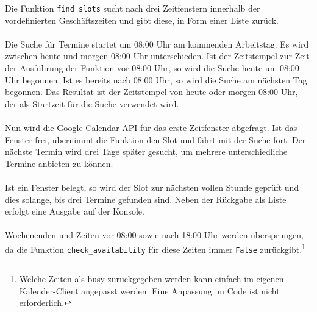                 Die Funktion \verb|find_slots| sucht nach drei Zeitfenstern innerhalb der vordefinierten Geschäftszeiten und gibt diese, in Form einer Liste zurück. \\
                \\
                Die Suche für Termine startet um 08:00 Uhr am kommenden Arbeitstag. Es wird zwischen heute und morgen 08:00 Uhr unterschieden. Ist der Zeitstempel zur Zeit der Ausführung der Funktion vor 08:00 Uhr, so wird die Suche heute um 08:00 Uhr begonnen. Ist es bereits nach 08:00 Uhr, so wird die Suche am nächsten Tag begonnen. Das Resultat ist der Zeitstempel von heute oder morgen 08:00 Uhr, der als Startzeit für die Suche verwendet wird. \\
                \\
                Nun wird die Google Calendar API für das erste Zeitfenster abgefragt. Ist das Fenster frei, übernimmt die Funktion den Slot und fährt mit der Suche fort. Der nächste Termin wird drei Tage später gesucht, um mehrere unterschiedliche Termine anbieten zu können. \\
                \\
                Ist ein Fenster belegt, so wird der Slot zur nächsten vollen Stunde geprüft und dies solange, bis drei Termine gefunden sind. Neben der Rückgabe als Liste erfolgt eine Ausgabe auf der Konsole.\\
                \\
                Wochenenden und Zeiten vor 08:00 sowie nach 18:00 Uhr werden übersprungen, da die Funktion \verb|check_availability| für diese Zeiten immer \verb|False| zurückgibt.\footnote{Welche Zeiten als busy zurückgegeben werden kann einfach im eigenen Kalender-Client angepasst werden. Eine Anpassung im Code ist nicht erforderlich.}

